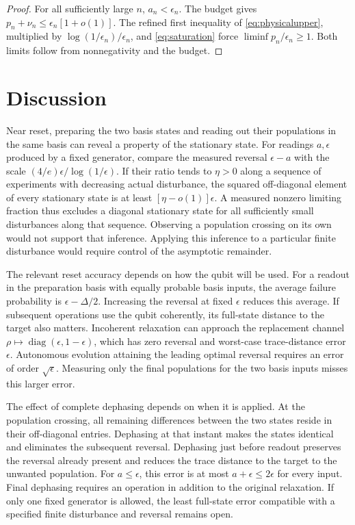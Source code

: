 \documentclass[aps,pra,reprint,amsmath,amssymb,nofootinbib,floatfix,longbibliography]{revtex4-2}
\theoremstyle{aps}
\DeclareMathOperator{\diag}{diag}
\newcommand{\eps}{\epsilon}
\begin{document}
\begin{proof}
For all sufficiently large $n$, $a_n<\eps_n$. The budget gives
$p_n+\nu_n\le\eps_n[1+o(1)]$. The refined first inequality of \eqref{eq:physicalupper}, multiplied by $\log(1/\eps_n)/\eps_n$, and \eqref{eq:saturation} force $\liminf p_n/\eps_n\ge1$. Both limits follow from nonnegativity and the budget.
\end{proof}

\section{Discussion}\label{sec:discussion}

Near reset, preparing the two basis states and reading out their populations in the same basis can reveal a property of the stationary state. For readings $a,\eps$ produced by a fixed generator, compare the measured reversal $\eps-a$ with the scale $(4/e)\eps/\log(1/\eps)$. If their ratio tends to $\eta>0$ along a sequence of experiments with decreasing actual disturbance, the squared off-diagonal element of every stationary state is at least $[\eta-o(1)]\eps$. A measured nonzero limiting fraction thus excludes a diagonal stationary state for all sufficiently small disturbances along that sequence. Observing a population crossing on its own would not support that inference. Applying this inference to a particular finite disturbance would require control of the asymptotic remainder.

The relevant reset accuracy depends on how the qubit will be used. For a readout in the preparation basis with equally probable basis inputs, the average failure probability is $\eps-\Delta/2$. Increasing the reversal at fixed $\eps$ reduces this average. If subsequent operations use the qubit coherently, its full-state distance to the target also matters. Incoherent relaxation can approach the replacement channel $\rho\mapsto\diag(\eps,1-\eps)$, which has zero reversal and worst-case trace-distance error $\eps$. Autonomous evolution attaining the leading optimal reversal requires an error of order $\sqrt\eps$. Measuring only the final populations for the two basis inputs misses this larger error.

The effect of complete dephasing depends on when it is applied. At the population crossing, all remaining differences between the two states reside in their off-diagonal entries. Dephasing at that instant makes the states identical and eliminates the subsequent reversal. Dephasing just before readout preserves the reversal already present and reduces the trace distance to the target to the unwanted population. For $a\le\eps$, this error is at most $a+\eps\le2\eps$ for every input. Final dephasing requires an operation in addition to the original relaxation. If only one fixed generator is allowed, the least full-state error compatible with a specified finite disturbance and reversal remains open.
\end{document}
